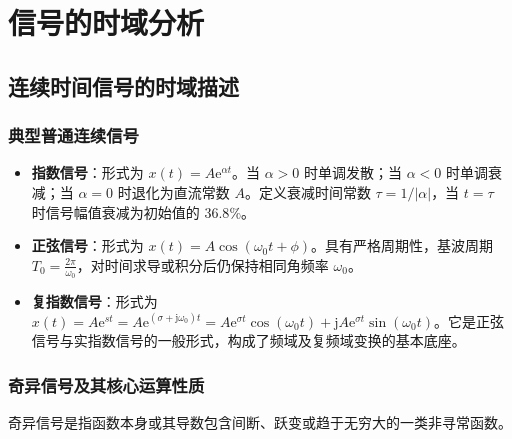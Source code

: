 \documentclass[11pt,a4paper,fontset=fandol]{ctexart}
\theoremstyle{remark}
\begin{document}
\section{信号的时域分析}

\subsection{连续时间信号的时域描述}

\subsubsection{典型普通连续信号}
\begin{itemize}
    \item \textbf{指数信号}：形式为 $x(t) = A\mathrm{e}^{\alpha t}$。当 $\alpha > 0$ 时单调发散；当 $\alpha < 0$ 时单调衰减；当 $\alpha = 0$ 时退化为直流常数 $A$。定义衰减时间常数 $\tau = 1/|\alpha|$，当 $t = \tau$ 时信号幅值衰减为初始值的 $36.8\%$。
    \item \textbf{正弦信号}：形式为 $x(t) = A\cos(\omega_0 t + \phi)$。具有严格周期性，基波周期 $T_0 = \frac{2\pi}{\omega_0}$，对时间求导或积分后仍保持相同角频率 $\omega_0$。
    \item \textbf{复指数信号}：形式为 $x(t) = A\mathrm{e}^{st} = A\mathrm{e}^{(\sigma + \mathrm{j}\omega_0)t} = A\mathrm{e}^{\sigma t}\cos(\omega_0 t) + \mathrm{j}A\mathrm{e}^{\sigma t}\sin(\omega_0 t)$。它是正弦信号与实指数信号的一般形式，构成了频域及复频域变换的基本底座。
\end{itemize}

\subsubsection{奇异信号及其核心运算性质}
奇异信号是指函数本身或其导数包含间断、跃变或趋于无穷大的一类非寻常函数。
\end{document}
